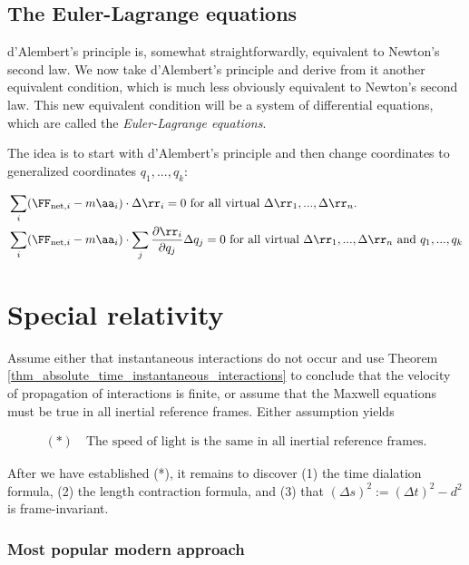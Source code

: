 \documentclass{article}
\begin{document}
\subsection*{The Euler-Lagrange equations}

d'Alembert's principle is, somewhat straightforwardly, equivalent to Newton's second law. We now take d'Alembert's principle and derive from it another equivalent condition, which is much less obviously equivalent to Newton's second law. This new equivalent condition will be a system of differential equations, which are called the \textit{Euler-Lagrange equations}.

The idea is to start with d'Alembert's principle and then change coordinates to generalized coordinates $q_1, ..., q_k$:

\begin{align*}
    &\sum_i (\FF_{\text{net},i} - m\aa_i) \cdot \Delta \rr_i = 0 \text{ for all virtual $\Delta \rr_1, ..., \Delta \rr_n$}. \\
    &\sum_i (\FF_{\text{net},i} - m\aa_i) \cdot \sum_j \frac{\pd \rr_i}{\pd q_j} \Delta q_j = 0 \text{ for all virtual $\Delta \rr_1, ..., \Delta \rr_n$ and $q_1, ..., q_k$}
\end{align*}


\newpage

\section*{Special relativity}

Assume either that instantaneous interactions do not occur and use Theorem \ref{thm_absolute_time_instantaneous_interactions} to conclude that the velocity of propagation of interactions is finite, or assume that the Maxwell equations must be true in all inertial reference frames. Either assumption yields

\begin{align*}
    (*) \quad \text{The speed of light is the same in all inertial reference frames.}
\end{align*}

After we have established (*), it remains to discover (1) the time dialation formula, (2) the length contraction formula, and (3) that $(\Delta s)^2 := (\Delta t)^2 - d^2$ is frame-invariant.

\subsubsection*{Most popular modern approach}
\end{document}
